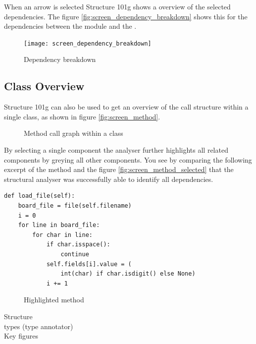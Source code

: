 \documentclass[12pt,halfparskip,DIV11,BCOR10mm]{scrreprt}
\begin{document}
When an arrow is selected Structure 101g shows a overview of the selected dependencies. The figure \vref{fig:screen_dependency_breakdown} shows this for the dependencies between the module  and the . 

\begin{figure}[H]
    \centering
    \texttt{[image: screen\_dependency\_breakdown]}
    \caption{Dependency breakdown}
    \label{fig:screen_dependency_breakdown}
\end{figure}

\subsection{Class Overview}

Structure 101g can also be used to get an overview of the call structure within a single class, as shown in figure \vref{fig:screen_method}. 

\begin{figure}[H]
    \centering
    \caption{Method call graph within a class}
    \label{fig:screen_method}
\end{figure}

By selecting a single component the analyser further highlights all related components by greying all other components. You see by comparing the  following excerpt of the method  and the figure \vref{fig:screen_method_selected} that the structural analyser was successfully able to identify all dependencies.

\begin{lstlisting}
def load_file(self):
    board_file = file(self.filename)
    i = 0        
    for line in board_file:
        for char in line:
            if char.isspace():
                continue
            self.fields[i].value = (
                int(char) if char.isdigit() else None)
            i += 1
\end{lstlisting}

\begin{figure}[H]
    \centering
    \caption{Highlighted method}
    \label{fig:screen_method_selected}
\end{figure}


Structure \\
types (type annotator)\\
Key figures
\end{document}
